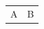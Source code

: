 \documentclass{article}
\begin{document}
\begin{tabular}{cc}
  \toprule
  A & B \\
\end{tabular}
\end{document}
